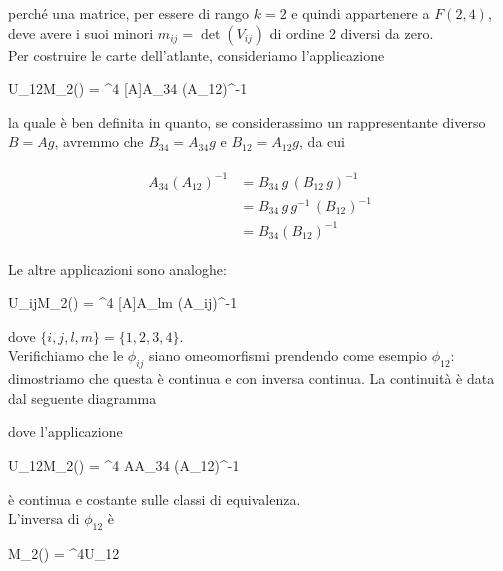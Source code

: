 perché una matrice, per essere di rango $ k=2 $ e quindi appartenere a $ F(2,4) $, deve avere i suoi minori $ m_{ij} = \det(V_{ij}) $ di ordine 2 diversi da zero.\\
Per costruire le carte dell'atlante, consideriamo l'applicazione

	{U_{12}}{M_{2}(\R) = \R^{4}}
	{[A]}{A_{34} (A_{12})^{-1}}

la quale è ben definita in quanto, se considerassimo un rappresentante diverso $ B = A g $, avremmo che $ B_{34} = A_{34} g $ e $ B_{12} = A_{12} g $, da cui

\begin{align}
	\begin{split}
		A_{34} (A_{12})^{-1} &= B_{34} \, g \, (B_{12} \, g)^{-1}\\
		&= B_{34} \, g \, g^{-1} \, (B_{12})^{-1}\\
		&= B_{34} (B_{12})^{-1}
	\end{split}
\end{align}

Le altre applicazioni sono analoghe:

	{U_{ij}}{M_{2}(\R) = \R^{4}}
	{[A]}{A_{lm} (A_{ij})^{-1}}

dove $ \{i,j,l,m\}=\{1,2,3,4\} $.\\
Verifichiamo che le $ \phi_{ij} $ siano omeomorfismi prendendo come esempio $ \phi_{12} $: dimostriamo che questa è continua e con inversa continua. La continuità è data dal seguente diagramma


dove l'applicazione

	{U_{12}}{M_{2}(\R) = \R^{4}}
	{A}{A_{34} (A_{12})^{-1}}

è continua e costante sulle classi di equivalenza.\\
L'inversa di $ \phi_{12} $ è

	{M_{2}(\R) = \R^{4}}{U_{12}}
	{}{}

